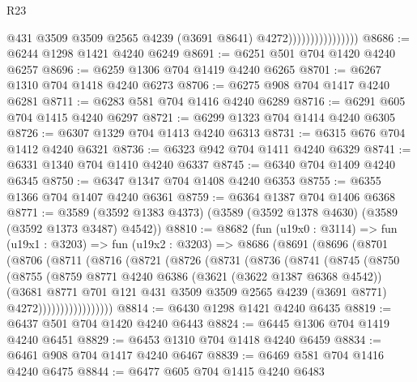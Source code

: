\begin{lexlean}{R23}
\begin{coremodule}
                                    @431
                                    @3509
                                    @3509
                                    @2565
                                    @4239
                                    (@3691 @8641)
                                    @4272))))))))))))))))
@8686 := @6244 @1298 @1421 @4240 @6249
@8691 := @6251 @501 @704 @1420 @4240 @6257
@8696 := @6259 @1306 @704 @1419 @4240 @6265
@8701 := @6267 @1310 @704 @1418 @4240 @6273
@8706 := @6275 @908 @704 @1417 @4240 @6281
@8711 := @6283 @581 @704 @1416 @4240 @6289
@8716 := @6291 @605 @704 @1415 @4240 @6297
@8721 := @6299 @1323 @704 @1414 @4240 @6305
@8726 := @6307 @1329 @704 @1413 @4240 @6313
@8731 := @6315 @676 @704 @1412 @4240 @6321
@8736 := @6323 @942 @704 @1411 @4240 @6329
@8741 := @6331 @1340 @704 @1410 @4240 @6337
@8745 := @6340 @704 @1409 @4240 @6345
@8750 := @6347 @1347 @704 @1408 @4240 @6353
@8755 := @6355 @1366 @704 @1407 @4240 @6361
@8759 := @6364 @1387 @704 @1406 @6368
@8771 := @3589 (@3592 @1383 @4373) (@3589 (@3592 @1378 @4630) (@3589 (@3592 @1373 @3487) @4542))
@8810 := @8682
    (fun (u19x0 : @3114) =>
    fun (u19x1 : @3203) =>
    fun (u19x2 : @3203) =>
    @8686
      (@8691
        (@8696
          (@8701
            (@8706
              (@8711
                (@8716
                  (@8721
                    (@8726
                      (@8731
                        (@8736
                          (@8741
                            (@8745
                              (@8750
                                (@8755
                                  (@8759
                                    @8771
                                    @4240
                                    @6386
                                    (@3621 (@3622 @1387 @6368 @4542))
                                    (@3681
                                      @8771
                                      @701
                                      @121
                                      @431
                                      @3509
                                      @3509
                                      @2565
                                      @4239
                                      (@3691 @8771)
                                      @4272)))))))))))))))))
@8814 := @6430 @1298 @1421 @4240 @6435
@8819 := @6437 @501 @704 @1420 @4240 @6443
@8824 := @6445 @1306 @704 @1419 @4240 @6451
@8829 := @6453 @1310 @704 @1418 @4240 @6459
@8834 := @6461 @908 @704 @1417 @4240 @6467
@8839 := @6469 @581 @704 @1416 @4240 @6475
@8844 := @6477 @605 @704 @1415 @4240 @6483

\end{coremodule}
\end{lexlean}
